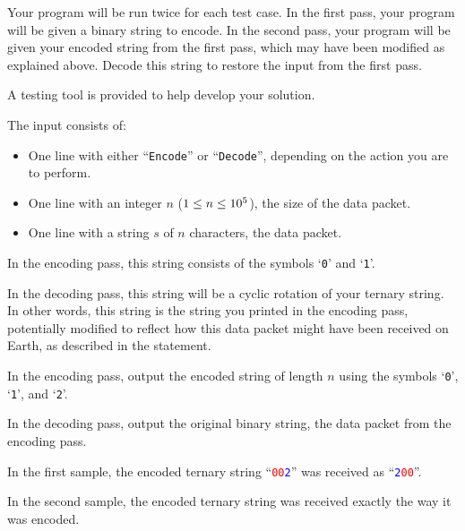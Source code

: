 Your program will be run twice for each test case.
In the first pass, your program will be given a binary string to encode.
In the second pass, your program will be given your encoded string from the first pass, which may have been modified as explained above.
Decode this string to restore the input from the first pass.

A testing tool is provided to help develop your solution.


\begin{Input}
    The input consists of:
    \begin{itemize}
        \item One line with either ``\texttt{Encode}'' or ``\texttt{Decode}'', depending on the action you are to perform.
        \item One line with an integer $n$ ($1 \leq n \leq 10^5$), the size of the data packet.
        \item One line with a string $s$ of $n$ characters, the data packet.
    \end{itemize}

    In the encoding pass, this string consists of the symbols `\texttt{0}' and `\texttt{1}'.

    In the decoding pass, this string will be a cyclic rotation of your ternary string. In other words, this string is the string you printed in the encoding pass, potentially modified to reflect how this data packet might have been received on Earth, as described in the statement.
\end{Input}

\begin{Output}
    In the encoding pass, output the encoded string of length $n$ using the symbols `\texttt{0}', `\texttt{1}', and `\texttt{2}'.

    In the decoding pass, output the original binary string, the data packet from the encoding pass.
\end{Output}

\nextsample

In the first sample, the encoded ternary string ``\textcolor{red}{\texttt{00}}\textcolor{blue}{\texttt{2}}'' was received as ``\textcolor{blue}{\texttt{2}}\textcolor{red}{\texttt{00}}''.

\nextsample

In the second sample, the encoded ternary string was received exactly the way it was encoded.
